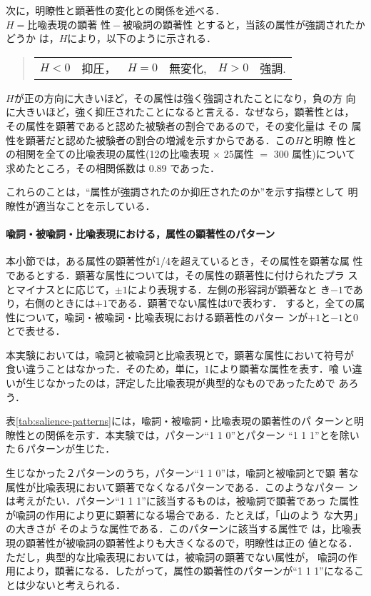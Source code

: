 次に，明瞭性と顕著性の変化との関係を述べる．$H = \mbox{比喩表現の顕著
性} - \mbox{被喩詞の顕著性}$ とすると，当該の属性が強調されたかどうか
は，$H$により，以下のように示される．
\begin{quote}
  \begin{tabular}{llllll}
    $H < 0$ & 抑圧，& $H = 0$ & 無変化,& $H > 0$ & 強調.
  \end{tabular}
\end{quote}
$H$\hspace{-0.1mm}が正の方向に大きいほど，その属性は強く強調されたことになり，\hspace{-0.1mm}負の方
向に大きいほど，\hspace{-0.1mm}強く抑圧されたことになると言える．なぜなら，顕著性とは，
その属性を顕著であると認めた被験者の割合であるので，その変化量は その
属性を顕著だと認めた被験者の割合の増減を示すからである．この$H$と明瞭
性との相関を全ての比喩表現の属性(12の比喩表現 $\times$ 25属性 $=$ 300
属性)について求めたところ，その相関係数は 0.89 であった．

これらのことは，``属性が強調されたのか抑圧されたのか''を示す指標として
明瞭性が適当なことを示している．

\paragraph{喩詞・被喩詞・比喩表現における，属性の顕著性のパターン}
本小節では，ある属性の顕著性が1/4を超えているとき，その属性を顕著な属
性であるとする．顕著な属性については，その属性の顕著性に付けられたプラ
スとマイナスとに応じて，$\pm 1$により表現する．左側の形容詞が顕著なと
き$-1$であり，右側のときには$+1$である．顕著でない属性は$0$で表わす．
すると，全ての属性について，喩詞・被喩詞・比喩表現における顕著性のパター
ンが$+1$と$-1$と$0$とで表せる．

本実験においては，喩詞と被喩詞と比喩表現とで，顕著な属性において符号が
食い違うことはなかった．そのため，単に，$1$により顕著な属性を表す．喰
い違いが生じなかったのは，評定した比喩表現が典型的なものであったためで
あろう．

表\ref{tab:salience-patterns}には，喩詞・被喩詞・比喩表現の顕著性のパ
ターンと明瞭性との関係を示す．本実験では，パターン``1 1 0''とパターン
``1 1 1''とを除いた６パターンが生じた．

生じなかった２パターンのうち，パターン``1 1 0''は，喩詞と被喩詞とで顕
著な属性が比喩表現において顕著でなくなるパターンである．このようなパター
ンは考えがたい．パターン``1 1 1''に該当するものは，被喩詞で顕著であっ
た属性が喩詞の作用により更に顕著になる場合である．たとえば，「山のよう
な大男」の大きさが そのような属性である．このパターンに該当する属性で
は，比喩表現の顕著性が被喩詞の顕著性よりも大きくなるので，明瞭性は正の
値となる．ただし，典型的な比喩表現においては，被喩詞の顕著でない属性が，
喩詞の作用により，顕著になる．したがって，属性の顕著性のパターンが``1
1 1''になることは少ないと考えられる．

